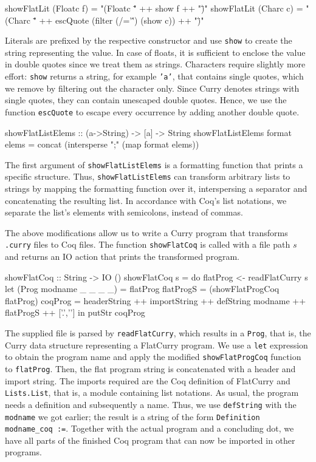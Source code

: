 \documentclass[paper = a4, fleqn, abstract=on, twoside]{scrreprt}
\newcommand{\coqinline}[1]{\texttt{#1}}
\begin{document}
\begin{haskellcode}
showFlatLit (Floatc f) = "(Floatc \"" ++ show f ++ "\")"
showFlatLit (Charc  c) = "(Charc \"" ++ escQuote (filter (/='\'') (show c))
                         ++ "\")"
\end{haskellcode}
Literals are prefixed by the respective constructor and use \texttt{show} to create the string representing the value. In case of floats, it is sufficient to enclose the value in double quotes since we treat them as strings. Characters require slightly more effort: \texttt{show} returns a string, for example \texttt{'a'}, that contains single quotes, which we remove by filtering out the character only. Since Curry denotes strings with single quotes, they can contain unescaped double quotes. Hence, we use the function \texttt{escQuote} to escape every occurrence by adding another double quote.\cite{CoqManualV8}
\begin{haskellcode}
showFlatListElems :: (a->String) -> [a] -> String
showFlatListElems format elems = concat (intersperse ";" (map format elems))
\end{haskellcode}
The first argument of \texttt{showFlatListElems} is a formatting function that prints a specific structure. Thus, \texttt{showFlatListElems} can transform arbitrary lists to strings by mapping the formatting function over it, interspersing a separator and concatenating the resulting list. In accordance with Coq's list notations, we separate the list's elements with semicolons, instead of commas.\\
\par\noindent
The above modifications allow us to write a Curry program that transforms \texttt{.curry} files to Coq files. The function \texttt{showFlatCoq} is called with a file path $s$ and returns an IO action that prints the transformed program. 
\begin{haskellcode}
showFlatCoq :: String -> IO ()
showFlatCoq s = do flatProg  <- readFlatCurry s
                   let (Prog modname _ _ _ _) = flatProg
                       flatProgS = (showFlatProgCoq flatProg)
                       coqProg   = headerString ++ importString
                                   ++ defString modname ++ flatProgS
                                   ++ ['.','\n']
                    in putStr coqProg
\end{haskellcode}
The supplied file is parsed by \texttt{readFlatCurry}, which results in a \texttt{Prog}, that is, the Curry data structure representing a FlatCurry program. We use a \texttt{let} expression to obtain the program name and apply the modified \texttt{showFlatProgCoq} function to \texttt{flatProg}. Then, the flat program string is concatenated with a header and import string. The imports required are the Coq definition of FlatCurry and \texttt{Lists.List}, that is, a module containing list notations.
As usual, the program needs a definition and subsequently a name. Thus, we use \texttt{defString} with the \texttt{modname} we got earlier; the result is a string of the form \coqinline{Definition modname_coq :=}. Together with the actual program and a concluding dot, we have all parts of the finished Coq program that can now be imported in other programs.
\end{document}
